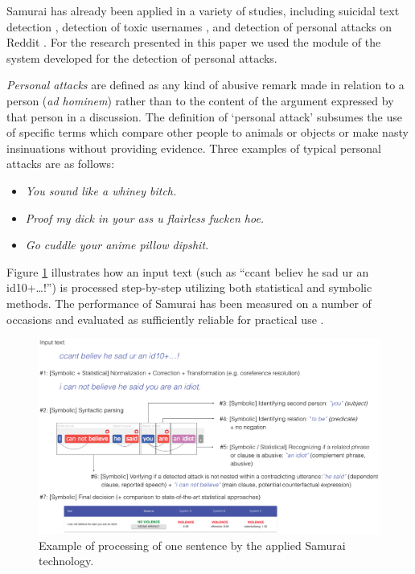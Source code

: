 \documentclass[preprint,12pt]{elsarticle}
\begin{document}
Samurai has already been applied in a variety of studies, including suicidal text detection \citep{ijerph182211759}, detection of toxic usernames \citep{URBANIAK2022107371}, and detection of personal attacks on Reddit \citep{urbaniak2022personal}. For the  research presented in this paper we used the module of the system developed for the detection of personal attacks. 



\textit{Personal attacks} are defined as any
kind of abusive remark made in relation to a person
(\textit{ad hominem}) rather than to the content of the argument
expressed by that person in a discussion. The definition of `personal
attack' subsumes the use of specific terms which compare other people to
animals or objects or make nasty insinuations without providing
evidence. Three examples of typical personal attacks are as follows:



\begin{itemize} 
\item \emph{You sound like a whiney bitch.}
\item \emph {Proof my dick in your ass u flairless fucken hoe.}
\item \emph {Go cuddle your anime pillow dipshit.} 
\end{itemize}



Figure \ref{fig:samuraiexample} illustrates how an  input text (such as ``ccant
believ he sad ur an id10+\ldots!'') is processed step-by-step utilizing
both statistical and symbolic methods. The performance of Samurai has been measured on a number of occasions and evaluated as sufficiently reliable for practical use \citep{ptaszynski2018cyberbullying,ijerph182211759,urbaniak2022personal,URBANIAK2022107371}.

\begin{figure}[t]
    \centering
    \includegraphics[width=\linewidth]{example.eps}
    \caption{Example of processing of one sentence by the applied Samurai technology.}
    \label{fig:samuraiexample}
\end{figure}
\end{document}
